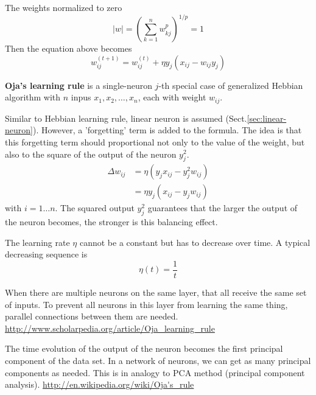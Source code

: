 The weights normalized to zero
\begin{equation}
|w| = \left(\sum_{k=1}^n w_{kj}^p \right)^{1/p} = 1
\end{equation}
Then the equation above becomes
\begin{equation}
w_{ij}^{(t+1)} = w_{ij}^{(t)} +\eta y_j (x_{ij} - w_{ij}y_j) 
\end{equation}


{\bf Oja's learning rule} is a single-neuron $j$-th special case of generalized
Hebbian algorithm with $n$ inpus $x_1, x_2, \ldots, x_n$, each with weight
$w_{ij}$. 

Similar to Hebbian learning rule, linear neuron is assumed
(Sect.\ref{sec:linear-neuron}). However, a 'forgetting' term is added to the
formula.
The idea is that this forgetting term should proportional not only 
to the value of the weight, but also to the square of the output of the neuron
$y_j^2$.
\begin{equation}
\begin{split}
\Delta w_{ij} &= \eta (y_j x_{ij} - y_j^2 w_{ij}) \\
   &=\eta y_j (x_{ij} - y_j w_{ij}) 
\end{split}
\end{equation}
with $i=1\ldots n$.
The squared output $y_j^2$ guarantees that the larger the output of the neuron
becomes, the stronger is this balancing effect.

The learning rate $\eta$ cannot be a constant but has to decrease over time. A
typical decreasing sequence is
\begin{equation}
\eta(t) = \frac{1}{t}
\end{equation}

When there are multiple neurons on the same layer, that all receive the same set
of inputs. To prevent all neurons in this layer from learning the same thing,
parallel connections between them are needed.
\url{http://www.scholarpedia.org/article/Oja_learning_rule}

The time evolution of the output of the neuron becomes the first principal
component of the data set. In a network of neurons, we can get as many principal
components as needed. This is in analogy to PCA method (principal component
analysis). 
\url{http://en.wikipedia.org/wiki/Oja's_rule}

